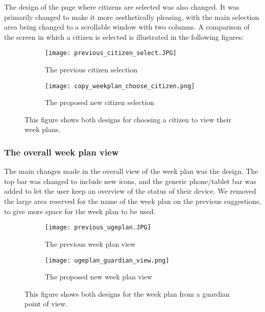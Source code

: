 \noindent
The design of the page where citizens are selected was also changed.
It was  primarily changed to make it more aesthetically pleasing, with the main selection area being changed to a scrollable window with two columns. 
A comparison of the screen in which a citizen is selected is illustrated in the following figures:
\begin{figure}[H]
    \begin{subfigure}{0.5\textwidth}
    \texttt{[image: previous\_citizen\_select.JPG]} 
    \caption{The previous citizen selection}
    \label{fig:previous_citizen_select}
    \end{subfigure}
    \begin{subfigure}{0.5\textwidth}
        \texttt{[image: copy\_weekplan\_choose\_citizen.png]}
    \caption{The proposed new citizen selection}
    \label{fig:new_citizen_select}
    \end{subfigure} 
    \caption{This figure shows both designs for choosing a citizen to view their week plans.}
    \label{fig:citizen_select}
\end{figure}
\noindent

\subsubsection{The overall week plan view}
The main changes made in the overall view of the week plan was the design. 
The top bar was changed to include new icons, and the generic phone/tablet bar was added to let the user keep an overview of the status of their device.
We removed the large area reserved for the name of the week plan on the previous suggestions, to give more space for the week plan to be used. 
\begin{figure}[H]
    \begin{subfigure}{0.5\textwidth}
    \texttt{[image: previous\_ugeplan.JPG]} 
    \caption{The previous week plan view}
    \label{fig:previous_weekplan_view}
    \end{subfigure}
    \begin{subfigure}{0.5\textwidth}
        \texttt{[image: ugeplan\_guardian\_view.png]}
    \caption{The proposed new week plan view}
    \label{fig:new_weekplan_view}
    \end{subfigure} 
    \caption{This figure shows both designs for the week plan from a guardian point of view.}
    \label{fig:weekplan_view}
\end{figure}

